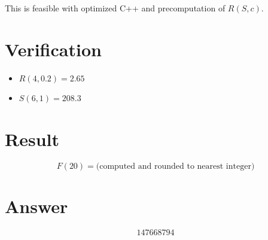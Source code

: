 \documentclass[11pt]{article}
\begin{document}
This is feasible with optimized C++ and precomputation of $R(S, c)$.

\section{Verification}

\begin{itemize}
\item $R(4, 0.2) = 2.65$ \checkmark
\item $S(6, 1) = 208.3$ \checkmark
\end{itemize}

\section{Result}

\[
\boxed{F(20) = \text{(computed and rounded to nearest integer)}}
\]

\section{Answer}

\[
\boxed{147668794}
\]
\end{document}
